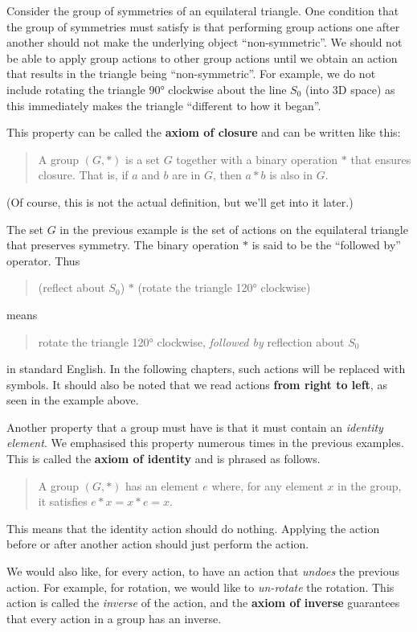 Consider the group of symmetries of an equilateral triangle. One condition that the group of symmetries must satisfy is that performing group actions one after another should not make the underlying object ``non-symmetric''. We should not be able to apply group actions to other group actions until we obtain an action that results in the triangle being ``non-symmetric''. For example, we do not include rotating the triangle 90° clockwise about the line $S_0$ (into 3D space) as this immediately makes the triangle ``different to how it began''.

This property can be called the \textbf{axiom of closure} and can be written like this:
\begin{quote}
    A group $(G, \ast)$ is a set $G$ together with a binary operation $\ast$ that ensures closure. That is, if $a$ and $b$ are in $G$, then $a \ast b$ is also in $G$.
\end{quote}
(Of course, this is not the actual definition, but we'll get into it later.)

\newpage

The set $G$ in the previous example is the set of actions on the equilateral triangle that preserves symmetry. The binary operation $\ast$ is said to be the ``followed by'' operator. Thus
\begin{quote}
    (reflect about $S_0$) $\ast$ (rotate the triangle 120° clockwise)
\end{quote}
means
\begin{quote}
    rotate the triangle 120° clockwise, \textit{followed by} reflection about $S_0$
\end{quote}
in standard English. In the following chapters, such actions will be replaced with symbols. It should also be noted that we read actions \textbf{from right to left}, as seen in the example above.

Another property that a group must have is that it must contain an \textit{identity element}. We emphasised this property numerous times in the previous examples. This is called the \textbf{axiom of identity} and is phrased as follows.
\begin{quote}
    A group $(G, \ast)$ has an element $e$ where, for any element $x$ in the group, it satisfies $e \ast x = x \ast e = x$.
\end{quote}
This means that the identity action should do nothing. Applying the action before or after another action should just perform the action.

We would also like, for every action, to have an action that \textit{undoes} the previous action. For example, for rotation, we would like to \textit{un-rotate} the rotation. This action is called the \textit{inverse} of the action, and the \textbf{axiom of inverse} guarantees that every action in a group has an inverse.

